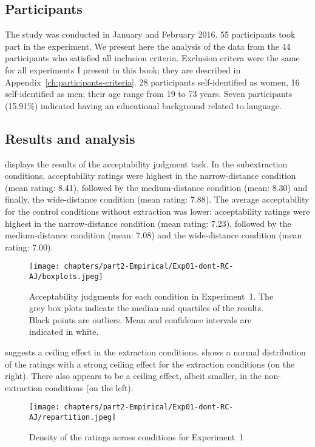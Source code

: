 \subsection{Participants}

The study was conducted in January and February 2016. 55 participants took part in the experiment. We present here the analysis of the data from the 44 participants who satisfied all inclusion criteria. Exclusion critera were the same for all experiments I present in this book; they are described in Appendix~\ref{ch:participants-criteria}.
28 participants self-identified as women, 16 self-identified as men; their age range from 19 to 73 years. Seven participants (15.91\%) indicated having an educational background related to language.

\subsection{Results and analysis}

 displays the results of the acceptability judgment task. In the subextraction conditions, acceptability ratings were highest in the narrow-distance condition (mean rating: 8.41), followed by the medium-distance condition (mean: 8.30) and finally, the wide-distance condition (mean rating: 7.88). The average acceptability for the control conditions without extraction was lower: acceptability ratings were highest in the narrow-distance condition (mean rating: 7.23), followed by the medium-distance condition (mean: 7.08) and the wide-distance condition (mean rating: 7.00).

\begin{figure}
    \centering
    \texttt{[image: chapters/part2-Empirical/Exp01-dont-RC-AJ/boxplots.jpeg]}
    \caption{Acceptability judgments for each condition in Experiment~1. The grey box plots indicate the median and quartiles of the results. Black points are outliers. Mean and confidence intervals are indicated in white.}
    \label{fig:exp01-boxplot}
\end{figure}

 suggests a ceiling effect in the extraction conditions.  shows a normal distribution of the ratings with a strong ceiling effect for the extraction conditions (on the right). There also appears to be a ceiling effect, albeit smaller, in the non-extraction conditions (on the left). 

\begin{figure}
    \centering
    \texttt{[image: chapters/part2-Empirical/Exp01-dont-RC-AJ/repartition.jpeg]}
    \caption{Density of the ratings across conditions for Experiment~1}
    \label{fig:exp01-repartition}
\end{figure}

